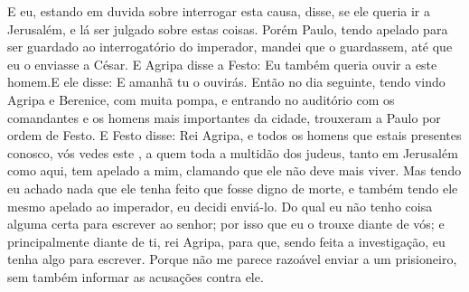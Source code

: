 {E eu, estando em duvida sobre
{} interrogar esta causa, disse,
{} se ele queria ir a Jerusalém, e lá ser julgado sobre estas coisas.
Porém Paulo, tendo apelado para ser guardado ao interrogatório do imperador, mandei que o guardassem, até que eu o enviasse a César.
E Agripa disse a Festo: Eu também queria ouvir a este homem.E ele disse: E amanhã tu o ouvirás.
Então no dia seguinte, tendo vindo Agripa e Berenice, com muita pompa, e entrando no auditório com os comandantes e os homens mais importantes da cidade, trouxeram a Paulo por ordem de Festo.
E Festo disse: Rei Agripa, e todos os homens que estais presentes
{} conosco, vós vedes este
{} , a quem toda a multidão dos judeus, tanto em Jerusalém como aqui, tem apelado a mim, clamando que ele não deve mais viver.
Mas tendo eu achado nada que ele tenha feito que fosse digno de morte, e também tendo ele mesmo apelado ao imperador, eu decidi enviá-lo.
Do qual eu não tenho coisa alguma certa para escrever ao
{} senhor; por isso que eu o trouxe diante de vós; e principalmente diante de ti, rei Agripa, para que, sendo feita a investigação, eu tenha algo para escrever.
Porque não me parece razoável enviar a um prisioneiro, sem também informar as acusações contra ele.

}
